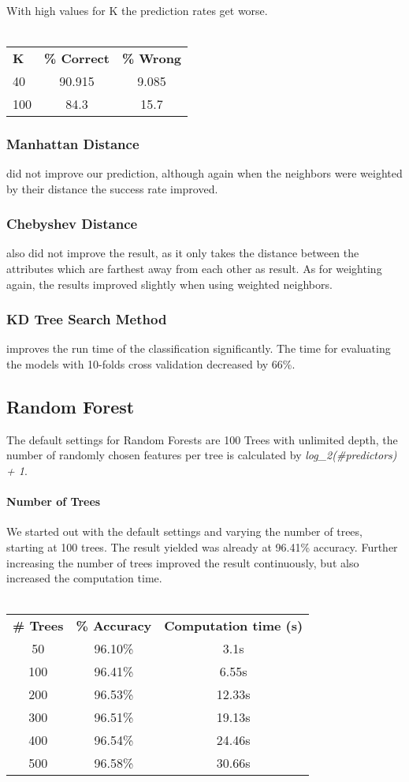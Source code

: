 \documentclass{sig-alternate-05-2015}
\begin{document}
\paragraph{}With high values for K the prediction rates get worse. 
\\\\
\begin{tabular}{ l | c | c }
\textbf{K} & \textbf{\% Correct} & \textbf{\% Wrong} \\
40 & 90.915 & 9.085 \\
100 &  84.3 & 15.7 \\
\end{tabular}
\subsubsection{Manhattan Distance} did not improve our prediction, although again when the neighbors were weighted by their distance the success rate improved.
\subsubsection{Chebyshev Distance} also did not improve the result, as it only takes the distance between the attributes which are farthest away from each other as result. As for weighting again, the results improved slightly when using weighted neighbors.
\subsubsection{KD Tree Search Method} improves the run time of the classification significantly. The time for evaluating the models with 10-folds cross validation decreased by 66\%. 

\subsection{Random Forest}
The default settings for Random Forests are 100 Trees with unlimited depth, the number of randomly chosen features per tree is calculated by \textit{log\_2(\#predictors) + 1}.
\paragraph{Number of Trees} We started out with the default settings and varying the number of trees, starting at 100 trees. The result yielded was already at 96.41\% accuracy. Further increasing the number of trees improved the result continuously, but also increased the computation time. 
\\\\
\begin{tabular}{ c | c | c }
\textbf{\# Trees} & \textbf{\% Accuracy} & \textbf{Computation time (s)} \\
50 & 96.10\% & 3.1s \\
100 & 96.41\% & 6.55s \\
200 & 96.53\% & 12.33s \\
300 & 96.51\% & 19.13s \\
400 & 96.54\% & 24.46s \\
500 & 96.58\% & 30.66s\\
\end{tabular}
\end{document}
